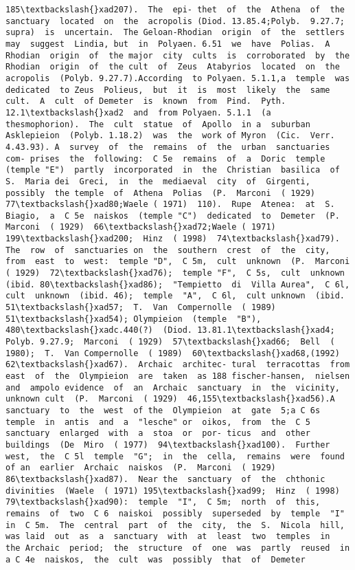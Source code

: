 \documentclass[11pt]{article}
\begin{document}
\begin{Verbatim}[commandchars=\\\{\}]
185\textbackslash{}xad207).  The  epi- thet  of  the  Athena  of  the  sanctuary  located  on  the  acropolis (Diod. 13.85.4;Polyb.  9.27.7;  supra)  is  uncertain.  The Geloan-Rhodian  origin  of  the  settlers  may  suggest  Lindia, but  in  Polyaen. 6.51  we  have  Polias.  A  Rhodian  origin  of  the major  city  cults  is  corroborated  by  the  Rhodian  origin  of  the cult  of  Zeus  Atabyrios  located  on  the  acropolis  (Polyb. 9.27.7).According  to Polyaen. 5.1.1,a  temple  was  dedicated  to Zeus  Polieus,  but  it  is  most  likely  the  same  cult.  A  cult  of Demeter  is  known  from  Pind.  Pyth. 12.1\textbackslash{}xad2  and  from Polyaen. 5.1.1  (a  thesmophorion).  The  cult  statue  of  Apollo  in a  suburban  Asklepieion  (Polyb. 1.18.2)  was  the  work of Myron  (Cic.  Verr. 4.43.93). A  survey  of  the  remains  of  the  urban  sanctuaries  com- prises  the  following:  C 5e  remains  of  a  Doric  temple  (temple "E")  partly  incorporated  in  the  Christian  basilica  of  S.  Maria dei  Greci,  in  the  mediaeval  city  of  Girgenti,  possibly  the temple  of  Athena  Polias  (P.  Marconi  ( 1929)  77\textbackslash{}xad80;Waele ( 1971)  110).  Rupe  Atenea:  at  S.  Biagio,  a  C 5e  naiskos  (temple "C")  dedicated  to  Demeter  (P.  Marconi  ( 1929)  66\textbackslash{}xad72;Waele ( 1971)  199\textbackslash{}xad200;  Hinz  ( 1998)  74\textbackslash{}xad79).  The  row  of  sanctuaries on  the  southern  crest  of  the  city,  from  east  to  west:  temple "D",  C 5m,  cult  unknown  (P.  Marconi  ( 1929)  72\textbackslash{}xad76);  temple "F",  C 5s,  cult  unknown  (ibid. 80\textbackslash{}xad86);  "Tempietto  di  Villa Aurea",  C 6l,  cult  unknown  (ibid. 46);  temple  "A",  C 6l,  cult unknown  (ibid. 51\textbackslash{}xad57;  T.  Van  Compernolle  ( 1989)  51\textbackslash{}xad54); Olympieion  (temple  "B"), 480\textbackslash{}xadc.440(?)  (Diod. 13.81.1\textbackslash{}xad4; Polyb. 9.27.9;  Marconi  ( 1929)  57\textbackslash{}xad66;  Bell  ( 1980);  T.  Van Compernolle  ( 1989)  60\textbackslash{}xad68,(1992)  62\textbackslash{}xad67).  Archaic  architec- tural  terracottas  from  east  of  the  Olympieion  are  taken  as 188 fischer-hansen,  nielsen  and  ampolo evidence  of  an  Archaic  sanctuary  in  the  vicinity,  unknown cult  (P.  Marconi  ( 1929)  46,155\textbackslash{}xad56).A  sanctuary  to  the  west  of the  Olympieion  at  gate  5;a C 6s  temple  in  antis  and  a  "lesche" or  oikos,  from  the  C 5  sanctuary  enlarged  with  a  stoa  or  por- ticus  and  other  buildings  (De  Miro  ( 1977)  94\textbackslash{}xad100).  Further west,  the  C 5l  temple  "G";  in  the  cella,  remains  were  found  of an  earlier  Archaic  naiskos  (P.  Marconi  ( 1929)  86\textbackslash{}xad87).  Near the  sanctuary  of  the  chthonic  divinities  (Waele  ( 1971) 195\textbackslash{}xad99;  Hinz  ( 1998)  79\textbackslash{}xad90):  temple  "I",  C 5m;  north  of  this, remains  of  two  C 6  naiskoi  possibly  superseded  by  temple  "I" in  C 5m.  The  central  part  of  the  city,  the  S.  Nicola  hill,  was laid  out  as  a  sanctuary  with  at  least  two  temples  in  the Archaic  period;  the  structure  of  one  was  partly  reused  in  a C 4e  naiskos,  the  cult  was  possibly  that  of  Demeter  
\end{Verbatim}
\end{document}
